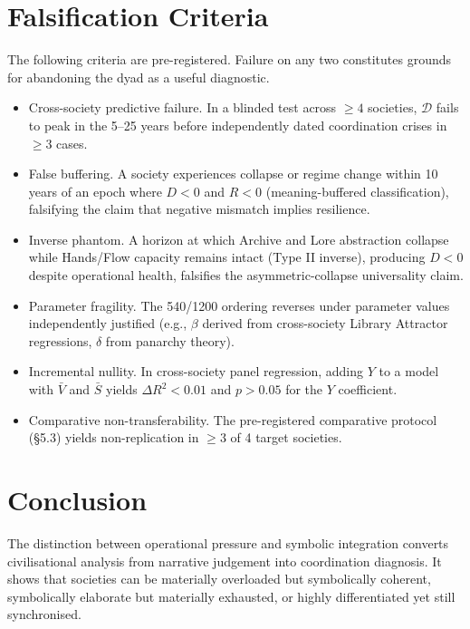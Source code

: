 \documentclass[11pt,a4paper]{article}
\begin{document}
\section{Falsification Criteria}
The following criteria are pre-registered. Failure on any two constitutes grounds for abandoning the dyad as a useful diagnostic.

\begin{itemize}
\item[\textbf{FC1.}] Cross-society predictive failure. In a blinded test across \(\geq4\) societies, \(\mathcal{D}\) fails to peak in the 5--25 years before independently dated coordination crises in \(\geq3\) cases.
\item[\textbf{FC2.}] False buffering. A society experiences collapse or regime change within 10 years of an epoch where \(D<0\) and \(R<0\) (meaning-buffered classification), falsifying the claim that negative mismatch implies resilience.
\item[\textbf{FC3.}] Inverse phantom. A horizon at which Archive and Lore abstraction collapse while Hands/Flow capacity remains intact (Type II inverse), producing \(D<0\) despite operational health, falsifies the asymmetric-collapse universality claim.
\item[\textbf{FC4.}] Parameter fragility. The 540/1200 ordering reverses under parameter values independently justified (e.g., \(\beta\) derived from cross-society Library Attractor regressions, \(\delta\) from panarchy theory).
\item[\textbf{FC5.}] Incremental nullity. In cross-society panel regression, adding \(Y\) to a model with \(\bar{V}\) and \(\bar{S}\) yields \(\Delta R^2<0.01\) and \(p>0.05\) for the \(Y\) coefficient.
\item[\textbf{FC6.}] Comparative non-transferability. The pre-registered comparative protocol (§5.3) yields non-replication in \(\geq3\) of 4 target societies.
\end{itemize}

\section{Conclusion}
The distinction between operational pressure and symbolic integration converts civilisational analysis from narrative judgement into coordination diagnosis. It shows that societies can be materially overloaded but symbolically coherent, symbolically elaborate but materially exhausted, or highly differentiated yet still synchronised.
\end{document}
